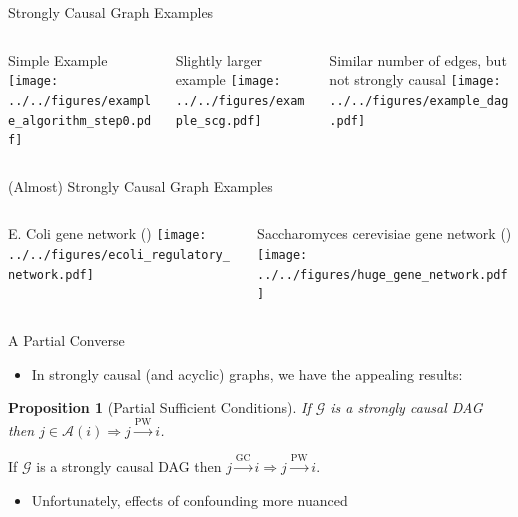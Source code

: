\documentclass{beamer} %
\newtheorem*{proposition}{Proposition}
\def\gc{\overset{\text{GC}}{\rightarrow}}  %
\def\pwgc{\overset{\text{PW}}{\rightarrow}}  %
\def\gcg{\mathcal{G}}  %
\newcommand{\anc}[1]{\mathcal{A}(#1)}  %
\begin{document}
\begin{frame}{Strongly Causal Graph Examples}
  \begin{columns}
    \begin{column}{0.33\linewidth}
      \small{Simple Example}
      \texttt{[image: ../../figures/example\_algorithm\_step0.pdf]}\pause
    \end{column}
    \begin{column}{0.33\linewidth}
      \small{Slightly larger example}
      \texttt{[image: ../../figures/example\_scg.pdf]}\pause
    \end{column}
    \begin{column}{0.33\linewidth}
      \small{Similar number of edges, but not strongly causal}
      \texttt{[image: ../../figures/example\_dag.pdf]}
    \end{column}
  \end{columns}
\end{frame}

\begin{frame}{(Almost) Strongly Causal Graph Examples}
  \begin{columns}
    \begin{column}{0.5\linewidth}
      \small{E. Coli gene network \tiny{()}}
      \texttt{[image: ../../figures/ecoli\_regulatory\_network.pdf]}\pause
    \end{column}
    \begin{column}{0.5\linewidth}
      \small{Saccharomyces cerevisiae gene network \tiny{()}}
      \texttt{[image: ../../figures/huge\_gene\_network.pdf]}\pause
    \end{column}
  \end{columns}
\end{frame}

\begin{frame}{A Partial Converse}
  \begin{itemize}
    \item{In strongly causal (and acyclic) graphs, we have the appealing results:}
  \end{itemize}

  \begin{proposition}[Partial Sufficient Conditions]
    \label{prop:pwgc_anc}
    If $\gcg$ is a strongly causal DAG then $j \in \anc{i} \Rightarrow j \pwgc i$.
  \end{proposition}\pause

  \begin{corollary}
    \label{cor:gc_implies_pwgc}
    If $\gcg$ is a strongly causal DAG then $j \gc i \Rightarrow j \pwgc i$.
  \end{corollary}\pause

  \begin{itemize}
    \item{Unfortunately, effects of confounding more nuanced}\pause
  \end{itemize}
\end{frame}
\end{document}
